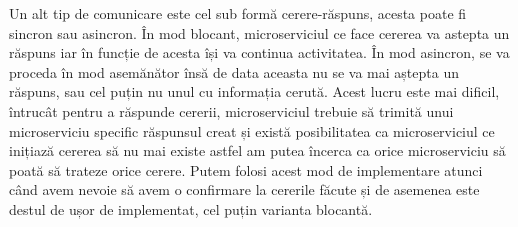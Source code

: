 Un alt tip de comunicare este cel sub formă cerere-răspuns, acesta poate fi sincron sau asincron.
În mod blocant, microserviciul ce face cererea va astepta un răspuns iar în funcție de acesta 
își va continua activitatea. În mod asincron, se va proceda în mod asemănător însă de data aceasta nu se
va mai aștepta un răspuns, sau cel puțin nu unul cu informația cerută. Acest lucru este mai dificil,
întrucât pentru a răspunde cererii, microserviciul trebuie să trimită unui microserviciu
specific răspunsul creat și există posibilitatea ca microserviciul ce inițiază cererea să
nu mai existe astfel am putea încerca ca orice microserviciu să poată să trateze orice cerere.
Putem folosi acest mod de implementare atunci când avem nevoie să avem o confirmare la 
cererile făcute și de asemenea este destul de ușor de implementat, cel puțin varianta blocantă.
